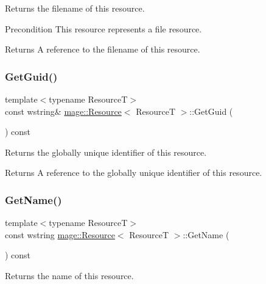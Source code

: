 Returns the filename of this resource.

\begin{DoxyPrecond}{Precondition}
This resource represents a file resource. 
\end{DoxyPrecond}
\begin{DoxyReturn}{Returns}
A reference to the filename of this resource. 
\end{DoxyReturn}
\mbox{\label{classmage_1_1_resource_adaa2464cb1fdb51a3f6028c0f316d083}} 
\subsubsection{\texorpdfstring{Get\+Guid()}{GetGuid()}}
{\footnotesize\ttfamily template$<$typename ResourceT$>$ \\
const wstring\& \mbox{\hyperlink{classmage_1_1_resource}{mage\+::\+Resource}}$<$ ResourceT $>$\+::Get\+Guid (\begin{DoxyParamCaption}{ }\end{DoxyParamCaption}) const\hspace{0.3cm}{\ttfamily [noexcept]}}

Returns the globally unique identifier of this resource.

\begin{DoxyReturn}{Returns}
A reference to the globally unique identifier of this resource. 
\end{DoxyReturn}
\mbox{\label{classmage_1_1_resource_a6414c6f8342f4cc92e7ed7861000cd2f}} 
\subsubsection{\texorpdfstring{Get\+Name()}{GetName()}}
{\footnotesize\ttfamily template$<$typename ResourceT$>$ \\
const wstring \mbox{\hyperlink{classmage_1_1_resource}{mage\+::\+Resource}}$<$ ResourceT $>$\+::Get\+Name (\begin{DoxyParamCaption}{ }\end{DoxyParamCaption}) const}

Returns the name of this resource.

